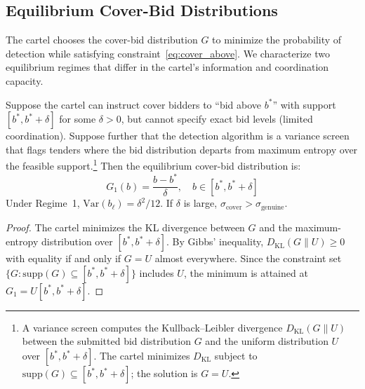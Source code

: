 
\subsection{Equilibrium Cover-Bid Distributions}
\label{sec:cover_distributions}

The cartel chooses the cover-bid distribution $G$ to minimize the
probability of detection while satisfying
constraint~\eqref{eq:cover_above}. We characterize two equilibrium
regimes that differ in the cartel's information and coordination
capacity.

\begin{proposition}
\label{prop:regime1}
Suppose the cartel can instruct cover bidders to ``bid above $b^*$''
with support $[b^*, b^* + \delta]$ for some $\delta > 0$, but cannot
specify exact bid levels (limited coordination). Suppose further that
the detection algorithm is a variance screen that flags tenders where
the bid distribution departs from maximum entropy over the feasible
support.\footnote{A variance screen computes the Kullback--Leibler
divergence $D_{\text{KL}}(G \| U)$ between the submitted bid
distribution $G$ and the uniform distribution $U$ over $[b^*, b^* +
\delta]$. The cartel minimizes $D_{\text{KL}}$ subject to
$\text{supp}(G) \subseteq [b^*, b^* + \delta]$; the solution is
$G = U$.} Then the equilibrium cover-bid distribution is:
\begin{equation}
  G_1(b) = \frac{b - b^*}{\delta}, \quad b \in [b^*, b^* + \delta]
  \label{eq:regime1}
\end{equation}
Under Regime~1, $\text{Var}(b_\ell) = \delta^2 / 12$. If $\delta$
is large, $\sigma_{\text{cover}} > \sigma_{\text{genuine}}$.
\end{proposition}

\begin{proof}
The cartel minimizes the KL divergence between $G$ and the maximum-entropy
distribution over $[b^*, b^* + \delta]$. By Gibbs' inequality,
$D_{\text{KL}}(G \| U) \geq 0$ with equality if and only if $G = U$
almost everywhere. Since the constraint set
$\{G : \text{supp}(G) \subseteq [b^*, b^* + \delta]\}$ includes $U$,
the minimum is attained at $G_1 = U[b^*, b^* + \delta]$.
\end{proof}

